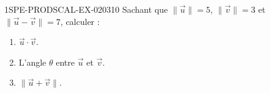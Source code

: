 \begin{exercice}{1SPE-PRODSCAL-EX-020}{3}{10}
Sachant que $\|\vec{u}\| = 5$, $\|\vec{v}\| = 3$ et $\|\vec{u} - \vec{v}\| = 7$, calculer :
\begin{enumerate}
  \item $\vec{u} \cdot \vec{v}$.
  \item L'angle $\theta$ entre $\vec{u}$ et $\vec{v}$.
  \item $\|\vec{u} + \vec{v}\|$.
\end{enumerate}
\end{exercice}
